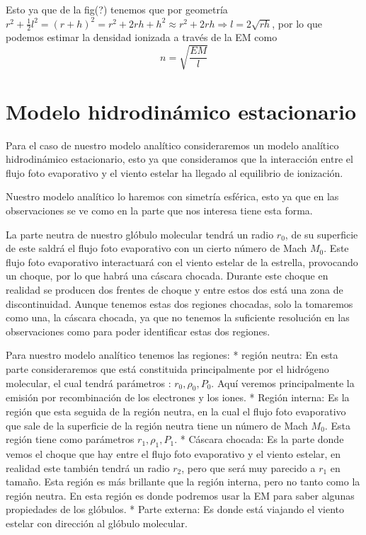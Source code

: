 \documentclass{book}
\begin{document}

Esto ya que de la fig(?) tenemos que por geometría $r^2+\frac{1}{2}l^2=(r+h)^2=r^2+2rh+h^2\approx r^2+2rh\Rightarrow l=2\sqrt{rh}$, por lo que podemos estimar la densidad ionizada a través de la EM como \[n=\sqrt{\frac{EM}{l}}\]

\section{Modelo hidrodinámico estacionario}

Para el caso de nuestro modelo analítico consideraremos un modelo analítico hidrodinámico estacionario, esto ya que consideramos que la interacción entre el flujo foto evaporativo y el viento estelar ha llegado al equilibrio de ionización.


Nuestro modelo analítico lo haremos con simetría esférica, esto ya que en las observaciones se ve como en la parte que nos interesa tiene esta forma. 

La parte neutra de nuestro glóbulo molecular tendrá un radio $r_0$, de su superficie de este saldrá el flujo foto evaporativo con un cierto número de Mach $M_0$. Este flujo foto evaporativo interactuará con el viento estelar de la estrella, provocando un choque, por lo que habrá una cáscara chocada. Durante este choque en realidad se producen dos frentes de choque y entre estos dos está una zona de  discontinuidad. Aunque tenemos estas dos regiones chocadas, solo la tomaremos como una, la cáscara chocada, ya que no tenemos la suficiente resolución en las observaciones como para poder identificar estas dos regiones.

Para nuestro modelo analítico tenemos las regiones:
* región neutra: En esta parte consideraremos que está constituida principalmente por el hidrógeno molecular, el cual tendrá parámetros : $r_0,\rho_0,P_0$. Aquí veremos principalmente la emisión por recombinación de los electrones y los iones.
* Región interna: Es la región que esta seguida de la región neutra, en la cual el flujo foto evaporativo que sale de la superficie de la región neutra tiene un número de Mach $M_0$. Esta región tiene como parámetros $r_1,\rho_1,P_1$.
* Cáscara chocada: Es la parte donde vemos el choque que hay entre el flujo foto evaporativo y el viento estelar, en realidad este también tendrá un radio $r_2$, pero que será muy parecido a $r_1$ en tamaño. Esta región es más brillante que la región interna, pero no tanto como la región neutra. En esta región es donde podremos usar la EM para saber algunas propiedades de los glóbulos. 
* Parte externa: Es donde está viajando el viento estelar con dirección al glóbulo molecular.
\end{document}
